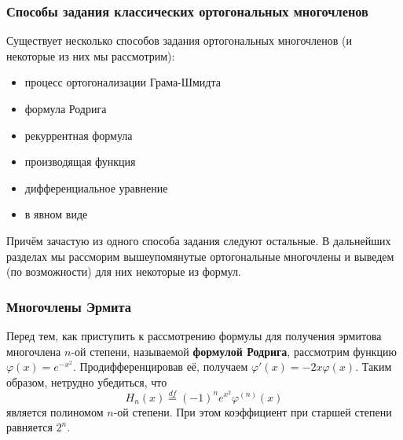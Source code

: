\documentclass[12pt]{article}
\begin{document}
		\subsubsection{Способы задания классических ортогональных многочленов}


			Существует несколько способов задания ортогональных многочленов (и некоторые из них мы
			рассмотрим):

			\begin{itemize}
				\item процесс ортогонализации Грама-Шмидта
				\item формула Родрига
				\item рекуррентная формула
				\item производящая функция
				\item дифференциальное уравнение
				\item в явном виде
			\end{itemize}

			Причём зачастую из одного способа задания следуют остальные. В дальнейших разделах мы рассморим вышеупомянутые ортогональные многочлены и выведем (по возможности) для них некоторые из формул.

		\subsubsection{Многочлены Эрмита}

			Перед тем, как приступить к рассмотрению формулы для получения эрмитова многочлена $n$-ой степени, называемой 
			\textbf{формулой Родрига}, рассмотрим функцию $\varphi(x) = e^{-x^2}$. Продифференцировав её, получаем
			$\varphi'(x) = -2x \varphi(x)$. Таким образом, нетрудно убедиться, что
			$$H_n(x) \overset{df}{=} (-1)^n e^{x^2} \varphi^{(n)} (x)$$
			является полиномом $n$-ой степени. При этом коэффициент при старшей степени равняется $2^n$.
	
\end{document}
